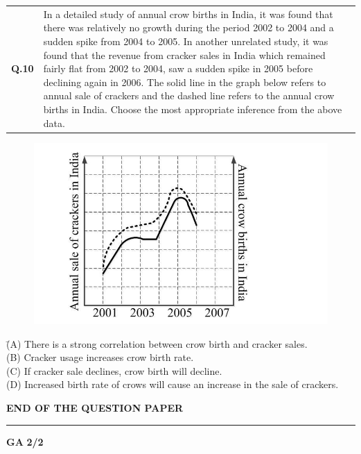 \documentclass[journal,12pt,onecolumn]{IEEEtran}
\theoremstyle{remark}
\begin{document}
\vspace{0.3cm}

\noindent
\begin{tabular}
{@{}ll} 
\textbf{Q.10} & \parbox[t]{0.85\textwidth}{In a detailed study of annual crow births in India, it was found that there was relatively no growth during the period 2002 to 2004 and a sudden spike from 2004 to 2005. In another unrelated study, it was found that the revenue from cracker sales in India which remained fairly flat from 2002 to 2004, saw a sudden spike in 2005 before declining again in 2006. The solid line in the graph below refers to annual sale of crackers and the dashed line refers to the annual crow births in India. Choose the most appropriate inference from the above data.}

\end{tabular}

\begin{figure}[h!]
    \centering
    \includegraphics[width=0.5\linewidth]{Figs/10i.png}
\end{figure}







\noindent
\begin{tabbing}
\hspace{1.5cm} \= (A) There is a strong correlation between crow birth and cracker sales. \\
\> (B) Cracker usage increases crow birth rate. \\
\> (C) If cracker sale declines, crow birth will decline. \\
\> (D) Increased birth rate of crows will cause an increase in the sale of crackers.
\end{tabbing}

\vspace{2em}

\begin{center}
    \textbf{END OF THE QUESTION PAPER}
\end{center}

 \hrule
\vspace{0.3cm}
\textbf{GA} \hfill  \textbf{2/2}
\end{document}

